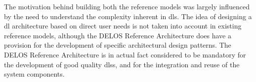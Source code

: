 The motivation behind building both the reference models was largely influenced by the need to understand the complexity inherent in \glspl{dl}. The idea of designing a \gls{dl} architecture based on direct user needs is not taken into account in existing reference models, although the DELOS Reference Architecture does have a provision for the development of specific architectural design patterns. The DELOS Reference Architecture is in actual fact considered to be mandatory for the development of good quality \glspl{dls}, and for the integration and reuse of the system components.